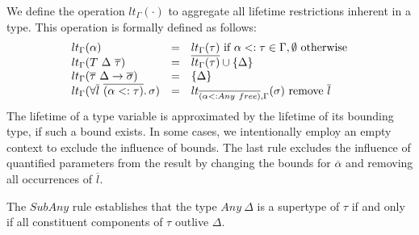 \documentclass[11pt]{article}
\newcommand{\ap}{~}
\begin{document}
    We define the operation $lt_\Gamma(\cdot)$ to aggregate all lifetime restrictions inherent in a type.
    This operation is formally defined as follows:
    \[
        \begin{array}{lll}
            lt_\Gamma(\alpha)                                                         & = & lt_\Gamma(\tau) \text{ if } \alpha <: \tau \in \Gamma, \emptyset \text{ otherwise}        \\
            lt_\Gamma(T\ap\Delta\ap\overline{\tau})                                   & = & \overline{lt_\Gamma(\tau)} \cup \{\Delta\}                                                \\
            lt_\Gamma(\overline{\tau}~\Delta\to\overline{\sigma})                     & = & \{\Delta\}                                                                                \\
            lt_{\Gamma}(\forall \overline{l}~\overline{(\alpha <: \tau)}\ldotp\sigma) & = & lt_{\overline{(\alpha <: Any\ap free)}, \Gamma}(\sigma) \text{ remove } \overline{l}
        \end{array}
    \]
    The lifetime of a type variable is approximated by the lifetime of its bounding type, if such a bound exists.
    In some cases, we intentionally employ an empty context to exclude the influence of bounds.
    The last rule excludes the influence of quantified parameters from the result by changing the bounds for $\overline{\alpha}$ and removing all occurrences of $\overline{l}$.

    The $SubAny$ rule establishes that the type $Any\ap \Delta$ is a supertype of $\tau$ if and only if all constituent components of $\tau$ outlive $\Delta$.

\end{document}
